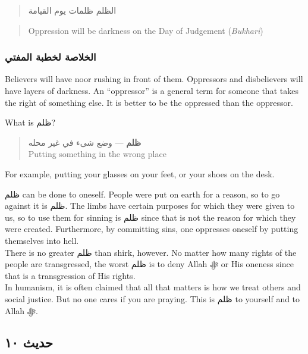 \documentclass[
]{book}
\begin{document}
\begin{quote}
الظلم ظلمات يوم القيامة
\end{quote}

\begin{quote}
Oppression will be darkness on the Day of Judgement (\emph{Bukhari})
\end{quote}

\hypertarget{ux627ux644ux62eux644ux627ux635ux629-ux644ux62eux637ux628ux629-ux627ux644ux645ux641ux62aux64a-8}{%
\subsubsection{الخلاصة لخطبة المفتي}\label{ux627ux644ux62eux644ux627ux635ux629-ux644ux62eux637ux628ux629-ux627ux644ux645ux641ux62aux64a-8}}

Believers will have noor rushing in front of them. Oppressors and disbelievers will have layers of darkness. An ``oppressor'' is a general term for someone that takes the right of something else. It is better to be the oppressed than the oppressor.

What is ظلم?

\begin{quote}
\textbf{ظلم} --- وضع شىء في غير محله\\
Putting something in the wrong place
\end{quote}

For example, putting your glasses on your feet, or your shoes on the desk.

ظلم can be done to oneself. People were put on earth for a reason, so to go against it is ظلم. The limbs have certain purposes for which they were given to us, so to use them for sinning is ظلم since that is not the reason for which they were created. Furthermore, by committing sins, one oppresses oneself by putting themselves into hell.\\
There is no greater ظلم than shirk, however. No matter how many rights of the people are transgressed, the worst ظلم is to deny Allah ﷻ or His oneness since that is a transgression of His rights.\\
In humanism, it is often claimed that all that matters is how we treat others and social justice. But no one cares if you are praying. This is ظلم to yourself and to Allah ﷻ.

\hypertarget{ux62dux62fux64aux62b-ux661ux660}{%
\subsection{حديث ١٠}\label{ux62dux62fux64aux62b-ux661ux660}}
\end{document}
